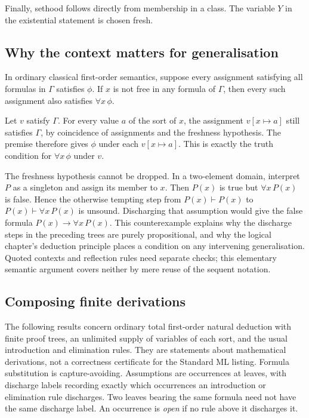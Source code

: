 Finally, sethood follows directly from membership in a class. The variable
$Y$ in the existential statement is chosen fresh.
\begin{prooftree}
\end{prooftree}

\subsection{Why the context matters for generalisation}
\begin{lemma}
In ordinary classical first-order semantics, suppose every assignment
satisfying all formulas in $\Gamma$ satisfies $\phi$. If $x$ is not free
in any formula of $\Gamma$, then every such assignment also satisfies
$\forall x\,\phi$.
\end{lemma}
\Proof
Let $v$ satisfy $\Gamma$. For every value $a$ of the sort of $x$,
the assignment $v[x\mapsto a]$ still satisfies $\Gamma$, by coincidence
of assignments and the freshness hypothesis. The premise therefore gives
$\phi$ under each $v[x\mapsto a]$. This is exactly the truth condition
for $\forall x\,\phi$ under $v$.
\Done

The freshness hypothesis cannot be dropped. In a two-element domain,
interpret $P$ as a singleton and assign its member to $x$. Then $P(x)$
is true but $\forall x\,P(x)$ is false. Hence the otherwise tempting
step from $P(x)\vdash P(x)$ to $P(x)\vdash\forall x\,P(x)$ is unsound.
Discharging that assumption would give the false formula
$P(x)\to\forall x\,P(x)$. This counterexample explains why the discharge
steps in the preceding trees are purely propositional, and why the
logical chapter's deduction principle places a condition on any
intervening generalisation. Quoted contexts and reflection rules need
separate checks; this elementary semantic argument covers neither by
mere reuse of the sequent notation.

\subsection{Composing finite derivations}
The following results concern ordinary total first-order natural deduction
with finite proof trees, an unlimited supply of variables of each sort,
and the usual introduction and elimination rules. They are statements
about mathematical derivations, not a correctness certificate for the
Standard ML listing. Formula substitution is capture-avoiding. Assumptions
are occurrences at leaves, with discharge labels recording exactly which
occurrences an introduction or elimination rule discharges. Two leaves
bearing the same formula need not have the same discharge label.
An occurrence is \emph{open} if no rule above it discharges it.

